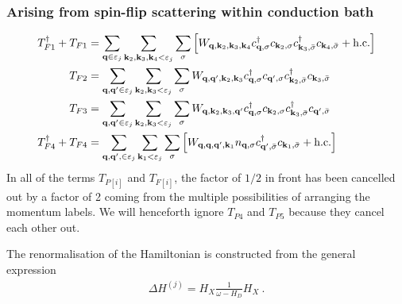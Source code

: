 \documentclass[reprint,hidelinks,onecolumn]{revtex4-2}
\begin{document}
\subsubsection*{Arising from spin-flip scattering within conduction bath}
\begin{equation}\begin{aligned}
	T_{F1}^\dagger + T_{F1} &= \sum_{{\bf q} \in \varepsilon_j}\sum_{{\bf k}_2, {\bf k}_3, {\bf k}_4 < \varepsilon_j}\sum_{\sigma} \left[W_{{\bf q},{\bf k}_2,{\bf k}_3,{\bf k}_4}c^\dagger_{{\bf q},\sigma}c_{{\bf k}_2,\sigma}c^\dagger_{{\bf k}_3,\bar\sigma}c_{{\bf k}_4,\bar\sigma} + \text{h.c.}\right]\\
	T_{F2} &= \sum_{{\bf q}, {\bf q}^\prime \in \varepsilon_j}\sum_{{\bf k}_2, {\bf k}_3 < \varepsilon_j}\sum_{\sigma}W_{{\bf q},{\bf q}^\prime,{\bf k}_2,{\bf k}_3} c^\dagger_{{\bf q},\sigma}c_{{\bf q}^\prime,\sigma}c^\dagger_{{\bf k}_2,\bar\sigma}c_{{\bf k}_3,\bar\sigma}\\
	T_{F3} &= \sum_{{\bf q}, {\bf q}^\prime \in \varepsilon_j}\sum_{{\bf k}_2, {\bf k}_3 < \varepsilon_j}\sum_{\sigma} W_{{\bf q},{\bf k}_2,{\bf k}_3,{\bf q}^\prime} c^\dagger_{{\bf q},\sigma}c_{{\bf k}_2,\sigma}c^\dagger_{{\bf k}_3,\bar\sigma}c_{{\bf q}^\prime,\bar\sigma} \\
	T_{F4}^\dagger + T_{F4} &= \sum_{{\bf q}, {\bf q}^\prime, \in \varepsilon_j}\sum_{{\bf k}_1 < \varepsilon_j}\sum_{\sigma} \left[W_{{\bf q},{\bf q},{\bf q}^{\prime}, {\bf k}_1} n_{{\bf q},\sigma} c^\dagger_{{\bf q}^{\prime},\bar\sigma}c_{{\bf k}_1,\bar\sigma} + \text{h.c.}\right]
\end{aligned}\end{equation}
In all of the terms \(T_{P[i]}\) and \(T_{F[i]}\), the factor of \(1/2\) in front has been cancelled out by a factor of 2 coming from the multiple possibilities of arranging the momentum labels. We will henceforth ignore \(T_{P4}\) and \(T_{P5}\) because they cancel each other out.

The renormalisation of the Hamiltonian is constructed from the general expression
\begin{equation}\begin{aligned}
	\Delta H^{(j)} = H_X \frac{1}{\omega- H_D} H_X~.
\end{aligned}\end{equation}
\end{document}
